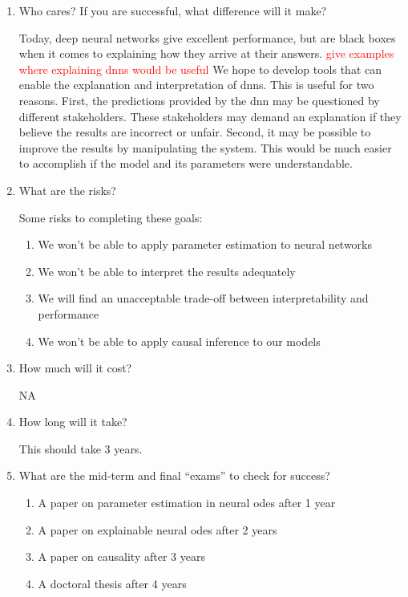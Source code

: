 \begin{enumerate}
    \item \label{q:heilmeier-whocares} Who cares? If you are successful, what difference will it make?

    Today,
    deep neural networks give excellent performance,
    but are black boxes when it comes to explaining how they arrive at their answers.
    \textcolor{red}{give examples where explaining \glspl{dnn} would be useful}
    We hope to develop tools that can enable the explanation and interpretation of
    \glspl{dnn}.
    This is useful for two reasons.
    First,
    the predictions provided by the \gls{dnn} may be questioned by different stakeholders.
   These stakeholders may demand an explanation if they believe the results are incorrect or unfair.
   Second,
   it may be possible to improve the results by manipulating the system.
   This would be much easier to accomplish if the model and its parameters were understandable.

    \item \label{q:heilmeier-risks} What are the risks?

    Some risks to completing these goals:
    \begin{enumerate}
        \item We won't be able to apply parameter estimation to neural networks
        \item We won't be able to interpret the results adequately
        \item We will find an unacceptable trade-off between interpretability and performance
        \item We won't be able to apply causal inference to our models
    \end{enumerate}

    \item \label{q:heilmeier-cost} How much will it cost?

    NA

    \item \label{q:heilmeier-time} How long will it take?

    This should take 3 years.

    \item \label{q:heilmeier-checks} What are the mid-term and final “exams” to check for success?

    \begin{enumerate}
        \item A paper on parameter estimation in neural \glspl{ode} after 1 year
        \item A paper on explainable neural \glspl{ode} after 2 years
        \item A paper on causality after 3 years
        \item A doctoral thesis after 4 years
    \end{enumerate}


\end{enumerate}





